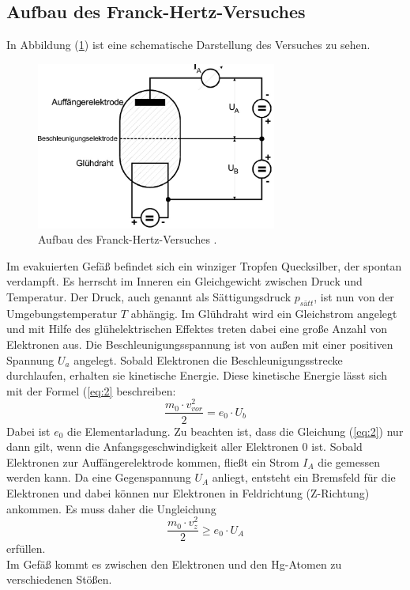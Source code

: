 \subsection{Aufbau des Franck-Hertz-Versuches}
In Abbildung (\ref{abb:1}) ist eine schematische Darstellung des Versuches zu sehen.
\begin{figure}[H]
\centering
\includegraphics[width =7 cm, height = 5.5cm]{content/Aufbau.jpg}
\caption{Aufbau des Franck-Hertz-Versuches \cite{1}.}
\label{abb:1}
\end{figure}
Im evakuierten Gefäß befindet sich ein winziger Tropfen Quecksilber, der spontan verdampft. Es herrscht im Inneren ein
Gleichgewicht zwischen Druck und Temperatur. Der Druck, auch genannt als Sättigungsdruck $p_{sätt}$, ist nun
von der Umgebungstemperatur $T$ abhängig.
Im Glühdraht wird ein Gleichstrom angelegt und mit Hilfe des glühelektrischen Effektes treten dabei eine große Anzahl von
Elektronen aus. Die Beschleunigungsspannung ist von außen mit einer positiven Spannung $U_a$ angelegt.
Sobald Elektronen die Beschleunigungsstrecke durchlaufen, erhalten sie kinetische Energie.
Diese kinetische Energie lässt sich mit der Formel (\ref{eq:2} beschreiben:
\begin{equation}
  \frac{m_0 \cdot v_{vor}^2} {2} = e_0 \cdot U_b
  \label{eq:2}
\end{equation}
Dabei ist $e_0$ die Elementarladung. Zu beachten ist, dass die Gleichung (\ref{eq:2}) nur dann gilt, wenn
die Anfangsgeschwindigkeit aller Elektronen $0$ ist.
Sobald Elektronen zur Auffängerelektrode kommen, fließt ein Strom $I_A$ die gemessen werden kann.
Da eine Gegenspannung $U_A$ anliegt, entsteht ein Bremsfeld für die Elektronen und dabei können nur Elektronen in Feldrichtung (Z-Richtung) ankommen.
Es muss daher die Ungleichung
\begin{equation*}
  \frac{m_0 \cdot v_{z}^2} {2} \geq e_0 \cdot U_A
\end{equation*}
erfüllen.\\
Im Gefäß kommt es zwischen den Elektronen und den Hg-Atomen zu verschiedenen Stößen.
